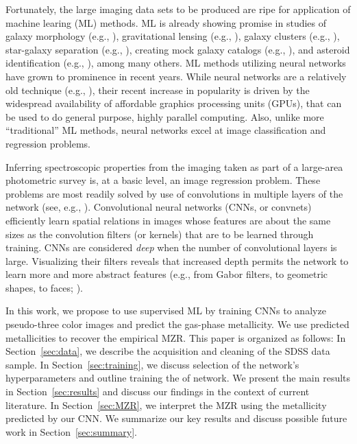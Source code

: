 \documentclass[fleqn,usenatbib]{mnras}
\newcommand{\eg}{e.g.}
\newcommand{\citeeg}[1]{(\eg, \citealt{#1})}
\begin{document}
Fortunately, the large imaging data sets to be produced are ripe for application of machine learing (ML) methods. ML is already showing promise in studies of galaxy morphology \citeeg{Dieleman2015, Huertas-Company2015, Beck2018, Dai2018, Hocking2018}, gravitational lensing \citeeg{Hezaveh2017, Lanusse2017, Petrillo2017, Petrillo2018}, galaxy clusters \citeeg{Ntampaka2015, Ntampaka2016}, star-galaxy separation \citeeg{Kim2017}, creating mock galaxy catalogs \citeeg{Xu2013}, and asteroid identification \citeeg{Smirnov2017}, among many others. ML methods utilizing neural networks have grown to prominence in recent years. While neural networks are a relatively old technique \citeeg{LeCun1989}, their recent increase in popularity is driven by the widespread availability of affordable graphics processing units (GPUs), that can be used to do general purpose, highly parallel computing. Also, unlike more ``traditional'' ML methods, neural networks excel at image classification and regression problems.

Inferring spectroscopic properties from the imaging taken as part of a large-area photometric survey is, at a basic level, an image regression problem. These problems are most readily solved by use of convolutions in multiple layers of the network (see, \eg, \citealt{Krizhevsky2012}). Convolutional neural networks (CNNs, or convnets) efficiently learn spatial relations in images whose features are about the same sizes as the convolution filters (or kernels) that are to be learned through training. CNNs are considered \textit{deep} when the number of convolutional layers is large. Visualizing their filters reveals that increased depth permits the network to learn more and more abstract features (\eg, from Gabor filters, to geometric shapes, to faces; \citealt{Zeiler2014}).

In this work, we propose to use supervised ML by training CNNs to analyze pseudo-three color images and predict the gas-phase metallicity. We use predicted metallicities to recover the empirical \cite{Tremonti2004} MZR. This paper is organized as follows: In Section~\ref{sec:data}, we describe the acquisition and cleaning of the SDSS data sample. In Section~\ref{sec:training}, we discuss selection of the network's hyperparameters and outline training the of network. We present the main results in Section~\ref{sec:results} and discuss our findings in the context of current literature. In Section~\ref{sec:MZR}, we interpret the MZR using the metallicity predicted by our CNN. We summarize our key results and discuss possible future work in Section~\ref{sec:summary}.
\end{document}
